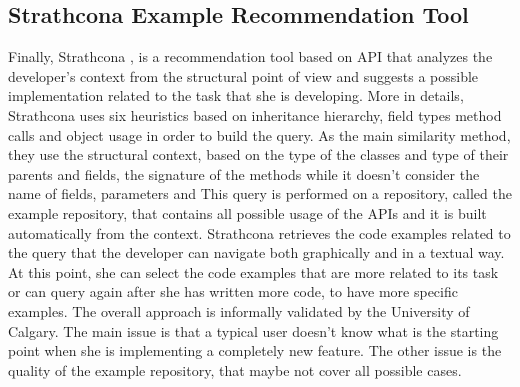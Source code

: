 \subsection{Strathcona Example Recommendation Tool}
Finally, Strathcona \cite{DBLP:conf/sigsoft/HolmesWM05}, is a recommendation tool based on API that analyzes the developer's context from the structural point of view and suggests a possible implementation related to the task that she is developing. More in details, Strathcona uses six heuristics based on inheritance hierarchy, field types method calls and object usage in order to build the query. As the main similarity method, they use the structural context, based on the type of the classes and  type of their parents and fields, the signature of the methods while it doesn't consider the name of fields, parameters and 
This query is performed on a repository, called the example repository, that contains all possible usage of the APIs and it is built automatically from the context. Strathcona retrieves the code examples related to the query that the developer can navigate both graphically and in a textual way. At this point, she can select the code examples that are more related to its task or can query again after she has written more code, to have more specific examples. The overall approach is informally validated by the University of Calgary. The main issue is that a typical user doesn't know what is the starting point when she is implementing a completely new feature. The other issue is the quality of the example repository, that maybe not cover all possible cases. 








